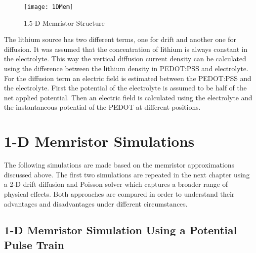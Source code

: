 \begin{doublespace}
 
\begin{figure}[!htp]
\centering
\texttt{[image: 1DMem]}
\caption{1.5-D Memristor Structure} 
\label{MemStc15}
\end{figure}

The lithium source has two different terms, one for drift and another one for diffusion. It was assumed that the concentration of lithium is always constant in the electrolyte. This way the vertical diffusion current density can be calculated using the difference between the lithium density in PEDOT:PSS and electrolyte. For the diffusion term an electric field is estimated between the PEDOT:PSS and the electrolyte. First the potential of the electrolyte is assumed to be half of the net applied potential. Then an electric field is calculated using the electrolyte and the instantaneous potential of the PEDOT at different positions.


\clearpage
\section{1-D Memristor Simulations}

The following simulations are made based on the memristor approximations discussed above. The first two simulations are repeated in the next chapter using a 2-D drift diffusion and Poisson solver which captures a broader range of physical effects. Both approaches are compared in order to understand their advantages and disadvantages under different circumstances.

\subsection{1-D Memristor Simulation Using a Potential Pulse Train}
  

\end{doublespace}
